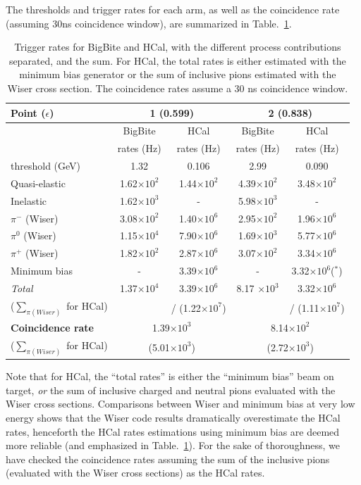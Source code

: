 The thresholds and trigger rates for each arm, as well as the coincidence rate (assuming 30ns coincidence window), are summarized in Table.~\ref{tab:TrigRates}.
\begin{table}[h]
\centering
\begin{tabular}{|l|c|c|c|c|}
\hline
Point ($\epsilon$) & \multicolumn{2}{|c|}{1 (0.599)} & \multicolumn{2}{c|}{2 (0.838)} \\
\hline
& BigBite & HCal & BigBite & HCal \\ 
& rates (Hz) & rates (Hz) & rates (Hz) & rates (Hz) \\
\hline
threshold (GeV) & 1.32 & 0.106 & 2.99 & 0.090 \\
\hline
Quasi-elastic   & 1.62$\times 10^{2}$ & 1.44$\times 10^{2}$ & 4.39$\times 10^{2}$ & 3.48$\times 10^{2}$ \\
Inelastic       & 1.62$\times 10^{3}$ & - & 5.98$\times 10^{3}$ & - \\
$\pi^-$ (Wiser) & 3.08$\times 10^{2}$ & 1.40$\times 10^{6}$ & 2.95$\times 10^{2}$ & 1.96$\times 10^{6}$ \\
$\pi^0$ (Wiser) & 1.15$\times 10^{4}$ & 7.90$\times 10^{6}$ & 1.69$\times 10^{3}$ & 5.77$\times 10^{6}$ \\
$\pi^+$ (Wiser) & 1.82$\times 10^{2}$ & 2.87$\times 10^{6}$ & 3.07$\times 10^{2}$ & 3.34$\times 10^{6}$ \\
Minimum bias    & - & 3.39$\times 10^{6}$ & - & 3.32$\times 10^{6}$($^*$) \\ 
\hline
{\em Total} & 1.37$\times 10^{4}$ & 3.39$\times 10^{6}$ & 8.17 $\times 10^{3}$ & 3.32$\times 10^{6}$ \\
($\sum_{\pi (Wiser)}$ for HCal) &  & / (1.22$\times 10^{7}$)  &  & / (1.11$\times 10^{7}$) \\
\hline
{\bf Coincidence rate} & \multicolumn{2}{|c|}{1.39$\times 10^{3}$} & \multicolumn{2}{|c|}{8.14$\times 10^{2}$} \\
($\sum_{\pi (Wiser)}$ for HCal) & \multicolumn{2}{|c|}{(5.01$\times 10^{3}$)} & \multicolumn{2}{c|}{(2.72$\times 10^{3}$)} \\
\hline
\end{tabular} 
\caption{Trigger rates for BigBite and HCal, with the different process contributions separated, and the sum. For HCal, the total rates is either estimated with the minimum bias generator or the sum of inclusive pions estimated with the Wiser cross section. The coincidence rates assume a 30 ns coincidence window.}
\label{tab:TrigRates}
\end{table}
Note that for HCal, the ``total rates'' is either the ``minimum bias'' beam on target, {\em or} the sum of inclusive charged and neutral pions evaluated with the Wiser cross sections. Comparisons between Wiser and minimum bias at very low energy shows that the Wiser code results dramatically overestimate the HCal rates, henceforth the HCal rates estimations using minimum bias are deemed more reliable (and emphasized in Table.~\ref{tab:TrigRates}). For the sake of thoroughness, we have checked the coincidence rates assuming the sum of the inclusive pions (evaluated with the Wiser cross sections) as the HCal rates.

